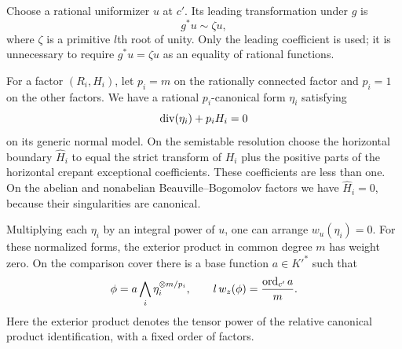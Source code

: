 Choose a rational uniformizer $u$ at $c'$. Its leading transformation
under $g$ is
\begin{equation}\label{eq:inertia-parameter}
                         g^*u\sim\zeta u,
\end{equation}
where $\zeta$ is a primitive $l$th root of unity.
Only the leading coefficient is used; it is unnecessary to require
$g^*u=\zeta u$ as an equality of rational functions.

For a factor $(R_i,H_i)$, let $p_i=m$ on the rationally connected factor
and $p_i=1$ on the other factors. We have a rational $p_i$-canonical form
$\eta_i$ satisfying
\[
                   \operatorname{div}(\eta_i)+p_iH_i=0
\]
on its generic normal model. On the semistable resolution choose the
horizontal boundary $\widehat H_i$ to equal the strict transform of
$H_i$ plus the positive parts of the horizontal crepant exceptional
coefficients. These coefficients are less than one. On the abelian
and nonabelian Beauville--Bogomolov factors we have $\widehat H_i=0$,
because their singularities are canonical.

\begin{lemma}\label{lem:normalized-product}
Multiplying each $\eta_i$ by an integral power of $u$, one can arrange
$w_u(\eta_i)=0$. For these normalized forms, the exterior product in
common degree $m$ has weight zero. On the comparison cover there is a
base function $a\in K'^*$ such that
\begin{equation}\label{eq:product-weight}
 \phi=a\bigwedge_i\eta_i^{\otimes m/p_i},
 \qquad
 l\,w_z(\phi)=\frac{\operatorname{ord}_{c'}a}{m}.
\end{equation}
Here the exterior product denotes the tensor power of the relative
canonical product identification, with a fixed order of factors.
\end{lemma}

